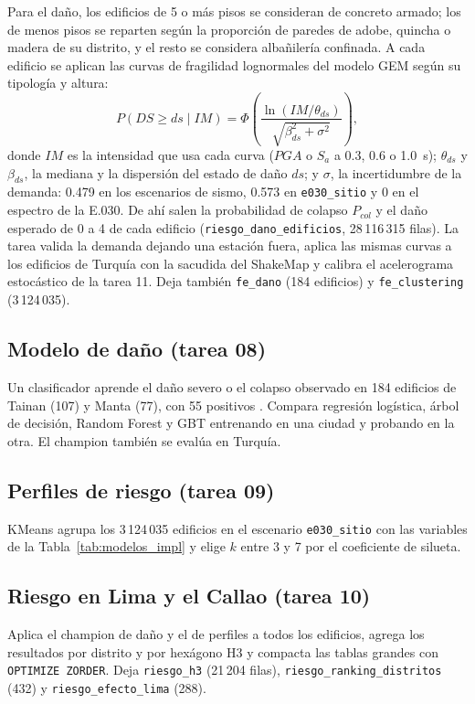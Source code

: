 \documentclass[conference]{IEEEtran}%
\begin{document}
Para el daño, los edificios de 5 o más pisos se consideran de concreto armado; los de menos pisos se reparten según la proporción de paredes de adobe, quincha o madera de su distrito, y el resto se considera albañilería confinada. A cada edificio se aplican las curvas de fragilidad lognormales del modelo GEM \cite{martins2021} según su tipología y altura:
\begin{equation}
P\!\left(DS\geq ds \mid IM\right)=\Phi\!\left(\frac{\ln\!\left(IM/\theta_{ds}\right)}{\sqrt{\beta_{ds}^{2}+\sigma^{2}}}\right),
\label{eq:fragilidad}
\end{equation}
donde $IM$ es la intensidad que usa cada curva ($PGA$ o $S_a$ a 0.3, 0.6 o 1.0~s); $\theta_{ds}$ y $\beta_{ds}$, la mediana y la dispersión del estado de daño $ds$; y $\sigma$, la incertidumbre de la demanda: 0.479 en los escenarios de sismo, 0.573 en \texttt{e030\_sitio} y 0 en el espectro de la E.030. De ahí salen la probabilidad de colapso $P_{col}$ y el daño esperado de 0 a 4 de cada edificio (\texttt{riesgo\_dano\_edificios}, 28\,116\,315 filas). La tarea valida la demanda dejando una estación fuera, aplica las mismas curvas a los edificios de Turquía con la sacudida del ShakeMap y calibra el acelerograma estocástico de la tarea 11. Deja también \texttt{fe\_dano} (184 edificios) y \texttt{fe\_clustering} (3\,124\,035).

\subsection{Modelo de daño (tarea 08)}
Un clasificador aprende el daño severo o el colapso observado en 184 edificios de Tainan (107) y Manta (77), con 55 positivos \cite{pujol2017,sim2017}. Compara regresión logística, árbol de decisión, Random Forest \cite{breiman2001rf} y GBT entrenando en una ciudad y probando en la otra. El champion también se evalúa en Turquía.

\subsection{Perfiles de riesgo (tarea 09)}
KMeans agrupa los 3\,124\,035 edificios en el escenario \texttt{e030\_sitio} con las variables de la Tabla~\ref{tab:modelos_impl} y elige $k$ entre 3 y 7 por el coeficiente de silueta.

\subsection{Riesgo en Lima y el Callao (tarea 10)}
Aplica el champion de daño y el de perfiles a todos los edificios, agrega los resultados por distrito y por hexágono H3 y compacta las tablas grandes con \texttt{OPTIMIZE ZORDER}. Deja \texttt{riesgo\_h3} (21\,204 filas), \texttt{riesgo\_ranking\_distritos} (432) y \texttt{riesgo\_efecto\_lima} (288).
\end{document}

